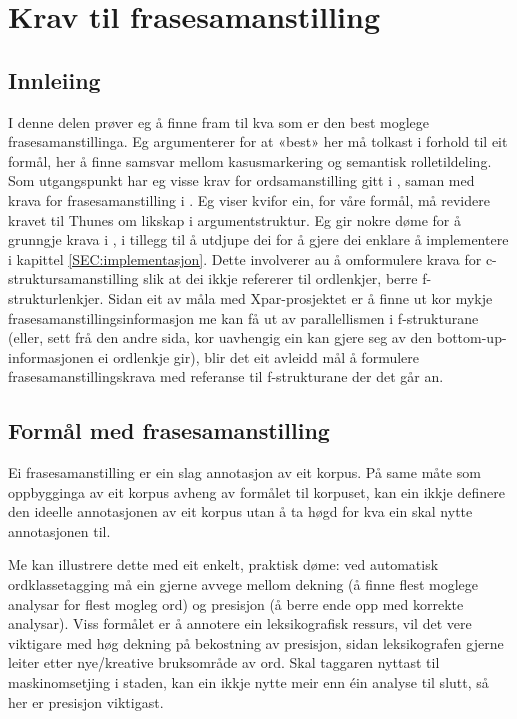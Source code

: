 \documentclass[11pt,a4paper,oneside,draft]{book}
\begin{document}
\chapter{Krav til frasesamanstilling}
\label{sec-3}

\label{SEC:ideell}

\section{Innleiing}
\label{sec-3.1}

I denne delen prøver eg å finne fram til kva som er den best moglege
frasesamanstillinga. Eg argumenterer for at «best» her må tolkast i
forhold til eit formål, her å finne samsvar mellom kasusmarkering og
semantisk rolletildeling. Som utgangspunkt har eg visse krav for
ordsamanstilling gitt i \citet{thunes2003eal}, saman med krava for
frasesamanstilling i \citet{dyvik2009lmp}. Eg viser kvifor ein, for
våre formål, må revidere kravet til Thunes om likskap i
argumentstruktur. Eg gir nokre døme for å grunngje krava i
\citet{dyvik2009lmp}, i tillegg til å utdjupe dei for å gjere dei
enklare å implementere i kapittel \ref{SEC:implementasjon}. Dette
involverer au å omformulere krava for c-struktursamanstilling slik at
dei ikkje refererer til ordlenkjer, berre f-strukturlenkjer. Sidan eit
av måla med Xpar-prosjektet er å finne ut kor mykje
frasesamanstillingsinformasjon me kan få ut av parallellismen i
f-strukturane (eller, sett frå den andre sida, kor uavhengig ein kan
gjere seg av den bottom-up-informasjonen ei ordlenkje gir), blir det
eit avleidd mål å formulere frasesamanstillingskrava med referanse til
f-strukturane der det går an.

\section{Formål med frasesamanstilling}
\label{sec-3.2}

\label{SEC:formaal}

Ei frasesamanstilling er ein slag annotasjon av eit korpus. På same
måte som oppbygginga av eit korpus avheng av formålet til korpuset,
kan ein ikkje definere den ideelle annotasjonen av eit korpus utan å
ta høgd for kva ein skal nytte annotasjonen til.

Me kan illustrere dette med eit enkelt, praktisk døme: ved automatisk
ordklassetagging må ein gjerne avvege mellom dekning (å finne flest
moglege analysar for flest mogleg ord) og presisjon (å berre ende opp
med korrekte analysar).  Viss formålet er å annotere ein
leksikografisk ressurs, vil det vere viktigare med høg dekning på
bekostning av presisjon, sidan leksikografen gjerne leiter etter
nye/kreative bruksområde av ord. Skal taggaren nyttast til
maskinomsetjing i staden, kan ein ikkje nytte meir enn éin analyse til
slutt, så her er presisjon viktigast.
\end{document}
